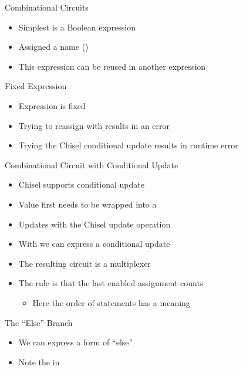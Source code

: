 \begin{frame}[fragile]{Combinational Circuits}
\begin{itemize}
\item Simplest is a Boolean expression
\item Assigned a name ()
\item This expression can be reused in another expression
\end{itemize}
\end{frame}

\begin{frame}[fragile]{Fixed Expression}
\begin{itemize}
\item Expression is fixed
\item Trying to reassign with \code{=} results in an error
\item Trying the Chisel conditional update \code{:=} results in runtime error
\end{itemize}
\end{frame}

\begin{frame}[fragile]{Combinational Circuit with Conditional Update}
\begin{itemize}
\item Chisel supports conditional update
\item Value first needs to be wrapped into a 
\item Updates with the Chisel update operation \code{:=}
\item With  we can express a conditional update
\item The resulting circuit is a multiplexer
\item The rule is that the last enabled assignment counts
\begin{itemize}
\item Here the order of statements has a meaning
\end{itemize}
\end{itemize}
\end{frame}

\begin{frame}[fragile]{The ``Else'' Branch}
\begin{itemize}
\item We can express a form of ``else''
\item Note the  in 
\end{itemize}
\end{frame}


